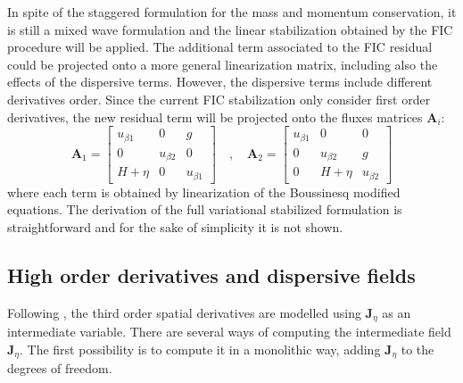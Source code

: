 In spite of the staggered formulation for the mass and momentum conservation, it is still a mixed wave formulation and the linear stabilization obtained by the FIC procedure will be applied. The additional term associated to the FIC residual could be projected onto a more general linearization matrix, including also the effects of the dispersive terms. However, the dispersive terms include different derivatives order. Since the current FIC stabilization only consider first order derivatives, the new residual term will be projected onto the fluxes matrices $\mathbf{A}_i$:
\begin{equation}
    \mathbf{A}_1 = \left[\begin{array}{ccc}
        u_{\beta1} &  0         &  g      \\
         0         & u_{\beta2} &  0      \\
         H+\eta    &  0         & u_{\beta1}
    \end{array}\right] \quad , \quad
    \mathbf{A}_2 = \left[\begin{array}{ccc}
        u_{\beta1} &  0         &  0      \\
         0         & u_{\beta2} &  g      \\
         0         & H+\eta     & u_{\beta2}
    \end{array}\right]
\end{equation}
where each term is obtained by linearization of the Boussinesq modified equations. The derivation of the full variational stabilized formulation is straightforward and for the sake of simplicity it is not shown.




\subsection{High order derivatives and dispersive fields}

Following \cite{walkley2002}, the third order spatial derivatives are modelled using $\mathbf{J}_\eta$ as an intermediate variable. There are several ways of computing the intermediate field $\mathbf{J}_\eta$. The first possibility is to compute it in a monolithic way, adding $\mathbf{J}_\eta$ to the degrees of freedom.


